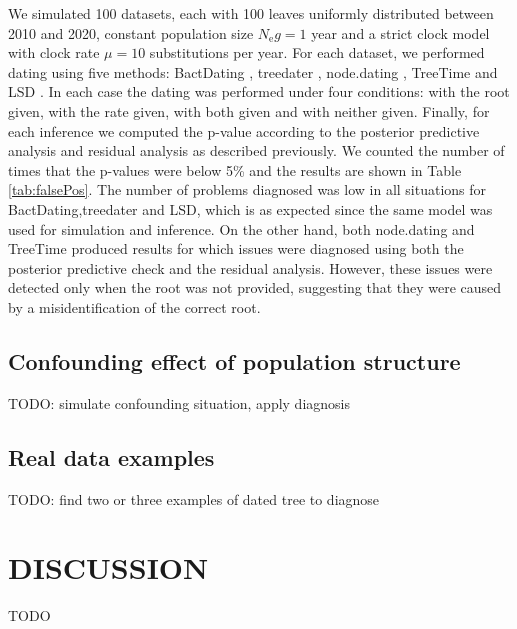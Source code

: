\documentclass{article}
\begin{document}
We simulated 100 datasets, each with 100 leaves 
uniformly distributed between 2010 and 2020, 
constant population size $N_\mathrm{e}g=1$ year and 
a strict clock model with  clock rate $\mu=10$ substitutions per year.
For each dataset, we performed dating using five methods: 
BactDating \citep{Didelot2018}, treedater \citep{Volz2017},
node.dating \citep{Jones2017}, TreeTime \citep{Sagulenko2018} and LSD \citep{To2016}.
In each case the dating was performed under four conditions:
with the root given, with the rate given, with both given and with neither given.
Finally, for each inference we computed the p-value according to the posterior
predictive analysis and residual analysis as described previously. We counted the number
of times that the p-values were below 5\% and the results are shown in 
Table \ref{tab:falsePos}. The number of problems diagnosed was low in all situations
for BactDating,treedater and LSD, which is as expected since the same model was used
for simulation and inference. 
On the other hand, both node.dating and TreeTime
produced results for which issues were diagnosed using
both the posterior predictive check and the residual analysis. However, these
issues were detected only when the root was not provided, suggesting that they
were caused by a misidentification of the correct root. 

\subsection*{Confounding effect of population structure} 

TODO: simulate confounding situation, apply diagnosis

\subsection*{Real data examples}

TODO: find two or three examples of dated tree to diagnose

\section*{DISCUSSION}

TODO 
\end{document}
